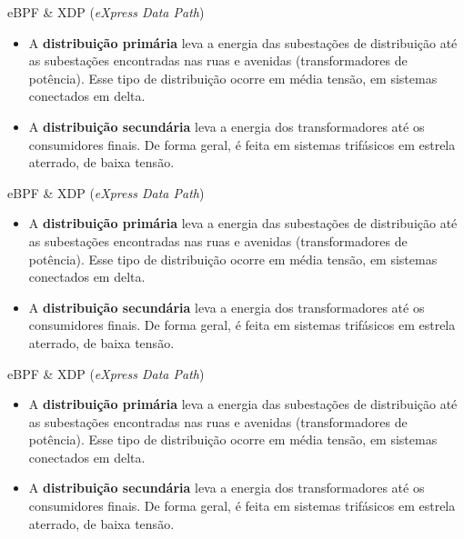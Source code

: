 \begin{frame}{eBPF \& XDP (\textit{eXpress Data Path})}
\begin{itemize}
		\item A \textbf{distribuição primária} leva a energia das subestações de distribuição até as subestações encontradas nas ruas e avenidas (transformadores de potência). Esse tipo de distribuição ocorre em média tensão, em sistemas conectados em delta.
		\item A \textbf{distribuição secundária} leva a energia dos transformadores até os consumidores finais. De forma geral, é feita em sistemas trifásicos em estrela aterrado, de baixa tensão.
	\end{itemize} 
\end{frame}

\begin{frame}{eBPF \& XDP (\textit{eXpress Data Path})}
\begin{itemize}
		\item A \textbf{distribuição primária} leva a energia das subestações de distribuição até as subestações encontradas nas ruas e avenidas (transformadores de potência). Esse tipo de distribuição ocorre em média tensão, em sistemas conectados em delta.
		\item A \textbf{distribuição secundária} leva a energia dos transformadores até os consumidores finais. De forma geral, é feita em sistemas trifásicos em estrela aterrado, de baixa tensão.
	\end{itemize} 
\end{frame}

\begin{frame}{eBPF \& XDP (\textit{eXpress Data Path})}
\begin{itemize}
		\item A \textbf{distribuição primária} leva a energia das subestações de distribuição até as subestações encontradas nas ruas e avenidas (transformadores de potência). Esse tipo de distribuição ocorre em média tensão, em sistemas conectados em delta.
		\item A \textbf{distribuição secundária} leva a energia dos transformadores até os consumidores finais. De forma geral, é feita em sistemas trifásicos em estrela aterrado, de baixa tensão.
	\end{itemize} 
\end{frame}

